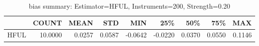 \begin{table}[ht]
\centering
\caption{bias summary: Estimator=HFUL, Instruments=200, Strength=0.20}
\begin{tabular}{lrrrrrrrr}
\toprule
 & COUNT & MEAN & STD & MIN & 25\% & 50\% & 75\% & MAX \\
\midrule
HFUL & 10.0000 & 0.0257 & 0.0587 & -0.0642 & -0.0220 & 0.0370 & 0.0550 & 0.1146 \\
\bottomrule
\end{tabular}
\end{table}
